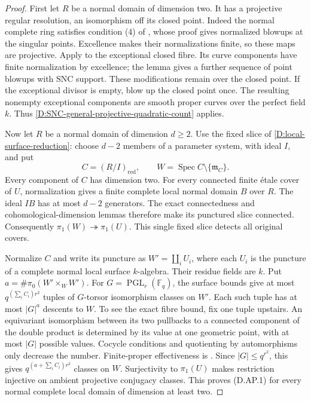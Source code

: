 \begin{proof}
First let \(R\) be a normal domain of dimension two.
It has a projective regular resolution, an isomorphism
off its closed point. Indeed the normal complete ring
satisfies condition (4) of
\citet[Theorem54.14.5, Tag0BGP]{StacksDSurfaceResolution},
whose proof gives normalized blowups at the singular
points. Excellence makes their normalizations finite,
so these maps are projective. Apply
\citet[Lemma54.15.6, Tag0BIC]{StacksDSurfaceResolution}
to the exceptional closed fibre. Its curve components
have finite normalization by excellence; the lemma
gives a further sequence of point blowups with SNC
support. These modifications remain over the closed
point. If the exceptional divisor is empty, blow up
the closed point once. The resulting nonempty
exceptional components are smooth proper curves
over the perfect field \(k\). Thus
\ref{D:SNC-general-projective-quadratic-count} applies.

Now let \(R\) be a normal domain of dimension \(d\geq2\).
Use the fixed slice of
\ref{D:local-surface-reduction}: choose \(d-2\) members
of a parameter system, with ideal \(I\), and put
\[
 C=(R/I)_{\mathrm{red}},\qquad
 W=\operatorname{Spec}C\setminus\{\mathfrak m_C\}.
 \]
Every component of \(C\) has dimension two.
For every connected finite étale cover of \(U\),
normalization gives a finite complete local normal
domain \(B\) over \(R\). The ideal \(IB\) has at most
\(d-2\) generators. The exact connectedness and
cohomological-dimension lemmas
\citep[Tags0ECR and0DX9]{C_StacksLocalSlice}
therefore make its punctured slice connected.
Consequently \(\pi_1(W)\twoheadrightarrow\pi_1(U)\).
This single fixed slice detects all original covers.

Normalize \(C\) and write its puncture as
\(W'=\coprod_i U_i\), where each \(U_i\) is the
puncture of a complete normal local surface
\(k\)-algebra. Their residue fields are \(k\).
Put \(a=\#\pi_0(W'\times_W W')\).
For \(G=\operatorname{PGL}_r(\mathbb F_q)\), the
surface bounds give at most \(q^{(\sum_i C_i)r^2}\)
tuples of \(G\)-torsor isomorphism classes on \(W'\).
Each such tuple has at most \(|G|^a\) descents to
\(W\). To see the exact fibre bound, fix one tuple
upstairs. An equivariant isomorphism between its
two pullbacks to a connected component of the
double product is determined by its value at one
geometric point, with at most \(|G|\) possible
values. Cocycle conditions and quotienting by
automorphisms only decrease the number.
Finite-proper effectiveness is
\citet[Expose IX, Theorem4.7 and its proof]{C_SGA1}.
Since \(|G|\leq q^{r^2}\), this gives
\(q^{(a+\sum_iC_i)r^2}\) classes on \(W\).
Surjectivity to \(\pi_1(U)\) makes restriction
injective on ambient projective conjugacy
classes. This proves (D.AP.1) for every normal
complete local domain of dimension at least two.


\end{proof}
